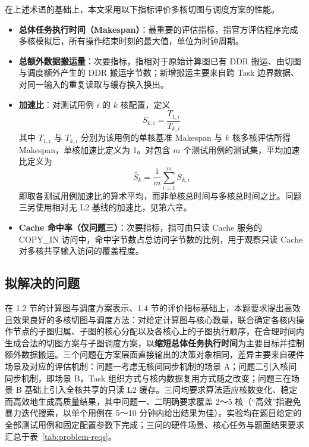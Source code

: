 在上述术语的基础上，本文采用以下指标评价多核切图与调度方案的性能。

\begin{itemize}
\item \textbf{总体任务执行时间（Makespan）}：最重要的评估指标，指官方评估程序完成多核模拟后，所有操作结束时刻的最大值，单位为时钟周期。
\item \textbf{总额外数据搬运量}：次要指标，指相对于原始计算图已有 DDR 搬运、由切图与调度额外产生的 DDR 搬运字节数；新增搬运主要来自跨 Task 边界数据、对同一输入的重复读取与缓存换入换出。
\item \textbf{加速比}：对测试用例 $i$ 的 $k$ 核配置，定义
  \[ S_{k,i}=\frac{T_{1,i}}{T_{k,i}} \]
  其中 $T_{1,i}$ 与 $T_{k,i}$ 分别为该用例的单核基准 Makespan 与 $k$ 核多核评估所得 Makespan，单核加速比定义为 1。对包含 $m$ 个测试用例的测试集，平均加速比定义为
  \[ \bar{S}_k=\frac{1}{m}\sum_{i=1}^{m} S_{k,i} \]
  即取各测试用例加速比的算术平均，而非单核总时间与多核总时间之比。问题三另使用相对无 L2 基线的加速比，见第六章。
\item \textbf{Cache 命中率（仅问题三）}：次要指标，指可由只读 Cache 服务的 COPY\_IN 访问中，命中字节数占总访问字节数的比例，用于观察只读 Cache 对多核共享输入访问的覆盖程度。
\end{itemize}

\subsection{拟解决的问题}\label{sec:problems}
在 1.2 节的计算图与调度方案表示、1.4 节的评价指标基础上，本题要求提出高效且效果良好的多核切图与调度方法：对给定计算图与核心数量，联合确定各核内操作节点的子图归属、子图的核心分配以及各核心上的子图执行顺序，在合理时间内生成合法的切图方案与子图调度方案，以\textbf{缩短总体任务执行时间}为主要目标并控制额外数据搬运。三个问题在方案层面直接输出的决策对象相同，差异主要来自硬件场景及对应的评估机制：问题一考虑无核间同步机制的场景 A；问题二引入核间同步机制，即场景 B，Task 组织方式与核内数据复用方式随之改变；问题三在场景 B 基础上引入全核共享的只读 L2 缓存。三问均要求算法适应核数变化、稳定而高效地生成高质量结果，其中问题一、二明确要求覆盖 2～5 核（“高效”指避免暴力迭代搜索，以单个用例在 5～10 分钟内给出结果为佳）。实验均在题目给定的全部测试用例和固定配置参数下完成；三问的硬件场景、核心任务与题面结果要求汇总于表~\ref{tab:problem-reqs}。

